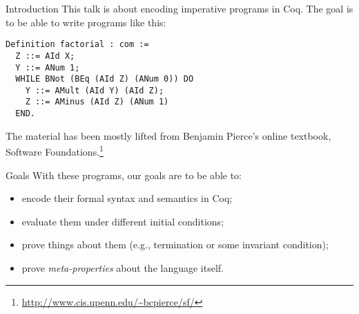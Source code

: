 \begin{frame}[fragile]{Introduction}
This talk is about encoding imperative programs in Coq. The goal is to be able 
to write programs like this:

\begin{block}{}
\begin{verbatim}
Definition factorial : com :=
  Z ::= AId X;
  Y ::= ANum 1;
  WHILE BNot (BEq (AId Z) (ANum 0)) DO
    Y ::= AMult (AId Y) (AId Z);
    Z ::= AMinus (AId Z) (ANum 1)
  END.
\end{verbatim}
\end{block}

The material has been mostly lifted from Benjamin Pierce's online textbook, 
Software Foundations.\footnote{\url{http://www.cis.upenn.edu/~bcpierce/sf/}}
\end{frame}

\begin{frame}[fragile]{Goals}
With these programs, our goals are to be able to:

\begin{itemize}
\item encode their formal syntax and semantics in Coq;
\item evaluate them under different initial conditions;
\item prove things about them (e.g., termination or some invariant condition);
\item prove \emph{meta-properties} about the language itself.
\end{itemize}
\end{frame}
